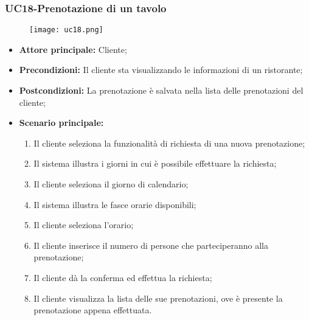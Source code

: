 \subsubsection{UC18-Prenotazione di un tavolo}
\begin{figure}[h] \texttt{[image: uc18.png]} \end{figure}
\begin{itemize}
    \item \textbf{Attore principale:} Cliente;
    \item \textbf{Precondizioni:} Il cliente sta visualizzando le informazioni di un ristorante;
    \item \textbf{Postcondizioni:} La prenotazione è salvata nella lista delle prenotazioni del cliente;
    \item \textbf{Scenario principale:}
        \begin{enumerate}
            \item Il cliente seleziona la funzionalità di richiesta di una nuova prenotazione;
            \item Il sistema illustra i giorni in cui è possibile effettuare la richiesta;
            \item Il cliente seleziona il giorno di calendario;
            \item Il sistema illustra le fasce orarie disponibili;
            \item Il cliente seleziona l'orario;
            \item Il cliente inserisce il numero di persone che parteciperanno alla prenotazione;
            \item Il cliente dà la conferma ed effettua la richiesta;
            \item Il cliente visualizza la lista delle sue prenotazioni, ove è presente la prenotazione appena effettuata.
        \end{enumerate}
\end{itemize}

\pagebreak

